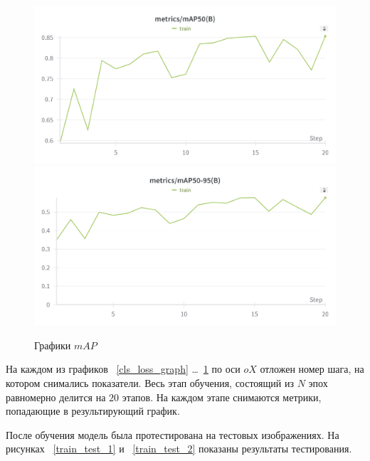 \begin{figure}
    \includegraphics[scale=0.15]{img/train/map_50.png}
    \includegraphics[scale=0.15]{img/train/map50_95.png}
    \caption{Графики $mAP$}
    \label{map_graph}
\end{figure}

На каждом из графиков ~\ref{cls_loss_graph} \dots ~\ref{map_graph} по оси $oX$ отложен номер шага, на котором снимались показатели. Весь этап обучения, состоящий из $N$ эпох равномерно делится на $20$ этапов. На каждом этапе снимаются метрики, попадающие в результирующий график.

После обучения модель была протестирована на тестовых изображениях. На рисунках ~\ref{train_test_1} и ~\ref{train_test_2} показаны результаты тестирования.

